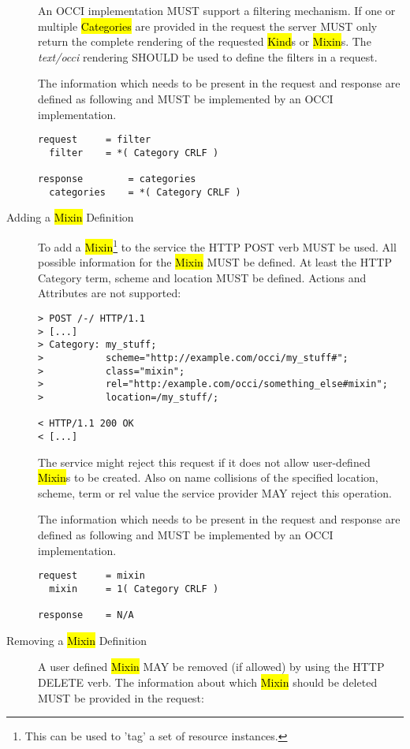 \documentclass[10pt,a4paper]{article}
\begin{document}
\begin{description}
    An OCCI implementation MUST support a filtering mechanism. If one
    or multiple \hl{Categories} are provided in the request the server
    MUST only return the complete rendering of the requested
    \hl{Kind}s or \hl{Mixin}s. The \emph{text/occi} rendering SHOULD
    be used to define the filters in a request.

    The information which needs to be present in the request and
    response are defined as following and MUST be implemented by an
    OCCI implementation.

\begin{verbatim}
request     = filter
  filter    = *( Category CRLF )

response        = categories
  categories    = *( Category CRLF )
\end{verbatim}

  \item[Adding a \hl{Mixin} Definition] To add a
    \hl{Mixin}\footnote{This can be used to 'tag' a set of resource
      instances.} to the service the HTTP POST verb MUST be used. All
    possible information for the \hl{Mixin} MUST be defined. At least
    the HTTP Category term, scheme and location MUST be
    defined. Actions and Attributes are not supported:

\begin{verbatim}
> POST /-/ HTTP/1.1
> [...]
> Category: my_stuff;
>           scheme="http://example.com/occi/my_stuff#";
>           class="mixin";
>           rel="http:/example.com/occi/something_else#mixin";
>           location=/my_stuff/;

< HTTP/1.1 200 OK
< [...]
\end{verbatim}

    The service might reject this request if it does not allow
    user-defined \hl{Mixin}s to be created. Also on name collisions of
    the specified location, scheme, term or rel value the service
    provider MAY reject this operation.

    The information which needs to be present in the request and
    response are defined as following and MUST be implemented by an
    OCCI implementation.

\begin{verbatim}
request     = mixin
  mixin     = 1( Category CRLF )

response    = N/A
\end{verbatim}

  \item[Removing a \hl{Mixin} Definition] A user defined \hl{Mixin}
    MAY be removed (if allowed) by using the HTTP DELETE verb. The
    information about which \hl{Mixin} should be deleted MUST be
    provided in the request:
    

\end{description}
\end{document}
